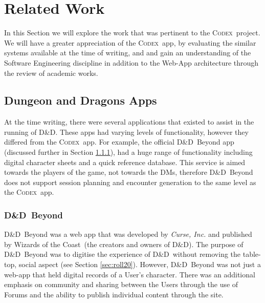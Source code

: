 \documentclass[final]{cmpreport}
\newcommand{\WotC}{Wizards of the Coast}
\newcommand{\dnd}{D\&D}
\newcommand{\Codex}{\textsc{Codex}}
\begin{document}
	\section{Related Work} \label{sec:related}
	In this Section we will explore the work that was pertinent to the \Codex \ project. We will have a greater appreciation of the \Codex \ app, by evaluating the similar systems available at the time of writing, and and gain an understanding of the Software Engineering discipline in addition to the Web-App architecture through the review of academic works.
	
		\subsection{Dungeon and Dragons Apps} \label{sec:other-dnd-apps}
		At the time writing, there were several applications that existed to assist in the running of \dnd. These apps had varying levels of functionality, however they differed from the \Codex \ app. For example, the official \dnd \ Beyond app \citep{dnd-beyond} (discussed further in Section \ref{sec:dnd-beyond}), had a huge range of functionality including digital character sheets and a quick reference database. This service is aimed towards the players of the game, not towards the DMs, therefore \dnd \ Beyond does not support session planning and encounter generation to the same level as the \Codex \ app.
		
			\subsubsection{\dnd \ Beyond} \label{sec:dnd-beyond}
			\dnd \ Beyond was a web app that was developed by \emph{Curse, Inc.} and published by \WotC \ (the creators and owners of \dnd). The purpose of \dnd \ Beyond was to digitise the experience of \dnd \ without removing the table-top, social aspect (see Section \ref{sec:roll20}). However, \dnd \ Beyond was not just a web-app that held digital records of a User's character. There was an additional emphasis on community and sharing between the Users through the use of Forums and the ability to publish individual content through the site. 
			
\end{document}
